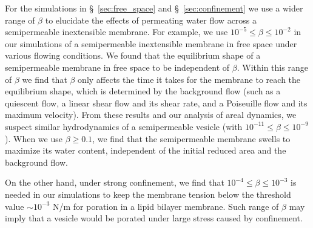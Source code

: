 \documentclass[prb,preprint,showpacs,preprintnumbers,amsmath,amssymb,longbibliography]{revtex4-1}
\begin{document}
For the simulations in \S~\ref{sec:free_space} and \S~\ref{sec:confinement} we use a wider range of $\beta$ to elucidate the effects of permeating water flow across a
semipermeable inextensible membrane.
%
For example, we use $10^{-5}\le\beta\le10^{-2}$ in our simulations of a
semipermeable inextensible membrane in free space under various flowing
conditions. We found that the equilibrium shape of a semipermeable
membrane in free space to be independent of $\beta$. Within this range
of $\beta$ we find that $\beta$ only affects the time it takes for the
membrane to reach the equilibrium shape, which is determined by the
background flow (such as a quiescent flow, a linear shear flow and its
shear rate, and a Poiseuille flow and its maximum velocity). From these
results and our analysis of areal dynamics, we suspect similar
hydrodynamics of a semipermeable vesicle (with $10^{-11}\le\beta\le
10^{-9}$). 
%
When we use $\beta\ge 0.1$, we find that the semipermeable membrane swells to maximize its water content, independent of the initial reduced 
area and the background flow.
%
%

On the other hand,
under strong confinement,  we find that $10^{-4}\le\beta\le10^{-3}$ is needed in our
simulations to keep the membrane tension below the threshold value $\sim 10^{-3}$ N/m for
poration in a lipid bilayer membrane. Such range of $\beta$ may imply
that a vesicle would be porated under large stress
caused by confinement.
\end{document}
